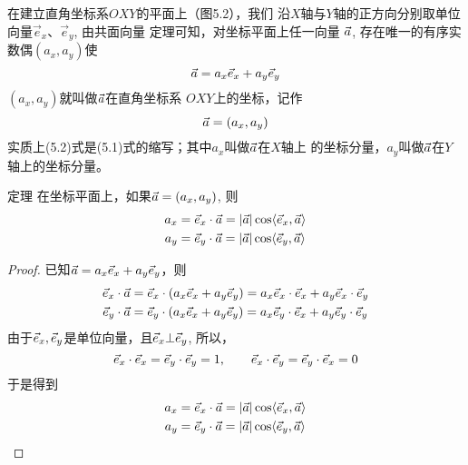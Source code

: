 在建立直角坐标系$OXY$的平面上（图5.2），我们
沿$X$轴与$Y$轴的正方向分别取单位向量$\vec{e}_x$、$\vec{e}_y$, 由共面向量
定理可知，对坐标平面上任一向量
$\vec{a}$, 存在唯一的有序实数偶$(a_x,a_y)$使
\begin{equation}
    \vec{a} =a_x \vec{e}_x+a_y \vec{e}_y
\end{equation}
$(a_x,a_y)$就叫做$\vec{a}$在直角坐标系
$OXY$上的坐标，记作
\begin{equation}
    \vec{a}=(a_x,a_y)
\end{equation}
实质上(5.2)式是(5.1)式的缩写；其中$a_x$叫做$\vec{a}$在$X$轴上
的坐标分量，$a_y$叫做$\vec{a}$在$Y$轴上的坐标分量。

\begin{blk}
    {定理} 在坐标平面上，如果$\vec{a}=(a_x,a_y)$, 则
    \begin{equation}
    \begin{split}
        a_x&=\vec{e}_x\cdot \vec{a}=|\vec{a}|\cos\langle\vec{e}_x,\vec{a}\rangle\\
        a_y&=\vec{e}_y\cdot \vec{a}=|\vec{a}|\cos\langle\vec{e}_y,\vec{a}\rangle\\
    \end{split}
    \end{equation}
\end{blk}

\begin{proof}
    已知$\vec{a} =a_x \vec{e}_x+a_y \vec{e}_y$，则
\[\begin{split}
   \vec{e}_x\cdot \vec{a}&=\vec{e}_x\cdot (a_x\vec{e}_x+a_y\vec{e}_y)=a_x\vec{e}_x\cdot \vec{e}_x+a_y\vec{e}_x\cdot \vec{e}_y\\
   \vec{e}_y\cdot \vec{a}&=\vec{e}_y\cdot (a_x\vec{e}_x+a_y\vec{e}_y)=a_x\vec{e}_y\cdot \vec{e}_x+a_y\vec{e}_y\cdot \vec{e}_y\\ 
\end{split}\]
由于$\vec{e}_x,\vec{e}_y$是单位向量，且$\vec{e}_x\bot \vec{e}_y$, 所以，
\[\vec{e}_x\cdot \vec{e}_x=\vec{e}_y\cdot \vec{e}_y=1,\qquad \vec{e}_x\cdot \vec{e}_y=\vec{e}_y\cdot \vec{e}_x=0\]
于是得到
\[    \begin{split}
    a_x&=\vec{e}_x\cdot \vec{a}=|\vec{a}|\cos\langle\vec{e}_x,\vec{a}\rangle\\
    a_y&=\vec{e}_y\cdot \vec{a}=|\vec{a}|\cos\langle\vec{e}_y,\vec{a}\rangle\\
\end{split}\]
\end{proof}

